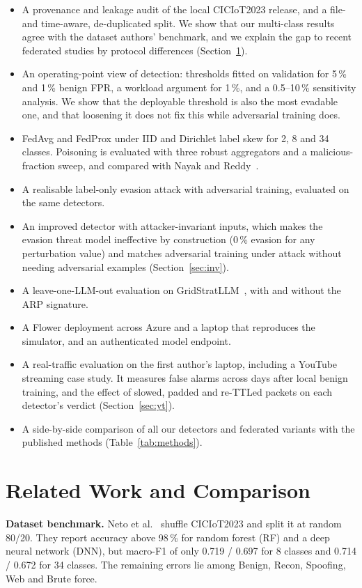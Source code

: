 \documentclass[conference]{IEEEtran}
\begin{document}
\begin{itemize}
\item A provenance and leakage audit of the local CICIoT2023 release, and a file- and time-aware, de-duplicated split. We show that our multi-class results agree with the dataset authors' benchmark, and we explain the gap to recent federated studies by protocol differences (Section~\ref{sec:lit}).
\item An operating-point view of detection: thresholds fitted on validation for 5\,\% and 1\,\% benign FPR, a workload argument for 1\,\%, and a 0.5--10\,\% sensitivity analysis. We show that the deployable threshold is also the most evadable one, and that loosening it does not fix this while adversarial training does.
\item FedAvg and FedProx under IID and Dirichlet label skew for 2, 8 and 34 classes. Poisoning is evaluated with three robust aggregators and a malicious-fraction sweep, and compared with Nayak and Reddy~\cite{nayak2026byzantine}.
\item A realisable label-only evasion attack with adversarial training, evaluated on the same detectors.
\item An improved detector with attacker-invariant inputs, which makes the evasion threat model ineffective by construction (0\,\% evasion for any perturbation value) and matches adversarial training under attack without needing adversarial examples (Section~\ref{sec:inv}).
\item A leave-one-LLM-out evaluation on GridStratLLM~\cite{kellerer2026gridstratdata}, with and without the ARP signature.
\item A Flower deployment across Azure and a laptop that reproduces the simulator, and an authenticated model endpoint.
\item A real-traffic evaluation on the first author's laptop, including a YouTube streaming case study. It measures false alarms across days after local benign training, and the effect of slowed, padded and re-TTLed packets on each detector's verdict (Section~\ref{sec:yt}).
\item A side-by-side comparison of all our detectors and federated variants with the published methods (Table~\ref{tab:methods}).
\end{itemize}

\section{Related Work and Comparison}\label{sec:lit}
\textbf{Dataset benchmark.} Neto et al.~\cite{neto2023ciciot} shuffle CICIoT2023 and split it at random 80/20. They report accuracy above 98\,\% for random forest (RF) and a deep neural network (DNN), but macro-F1 of only 0.719 / 0.697 for 8 classes and 0.714 / 0.672 for 34 classes. The remaining errors lie among Benign, Recon, Spoofing, Web and Brute force.
\end{document}
